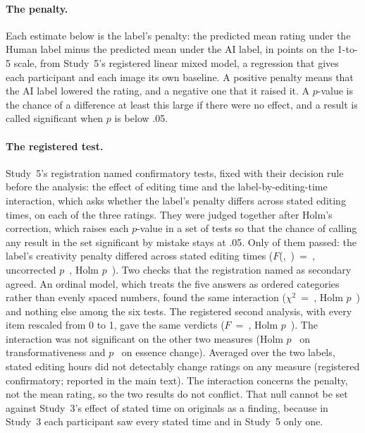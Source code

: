 \paragraph*{The penalty.}
Each estimate below is the label's penalty: the predicted mean rating under the Human label minus the predicted mean under the AI label, in points on the 1-to-5 scale, from Study~5's registered linear mixed model, a regression that gives each participant and each image its own baseline. A positive penalty means that the AI label lowered the rating, and a negative one that it raised it. A $p$-value is the chance of a difference at least this large if there were no effect, and a result is called significant when $p$ is below .05.

\paragraph*{The registered test.}
Study~5's registration named \SFiveNConfirmatory{} confirmatory tests, fixed with their decision rule before the analysis: the effect of editing time and the label-by-editing-time interaction, which asks whether the label's penalty differs across stated editing times, on each of the three ratings. They were judged together after Holm's correction, which raises each $p$-value in a set of tests so that the chance of calling any result in the set significant by mistake stays at .05. Only \SFiveNConfirmatoryHolmSignificant{} of them passed: the label's creativity penalty differed across stated editing times ($F$(\SFiveCreatSourceByEditTimeDfNum,~\SFiveCreatSourceByEditTimeDfDen)~=~\SFiveCreatSourceByEditTimeF, uncorrected $p$~\SFiveCreatSourceByEditTimeP, Holm $p$~\SFiveCreatSourceByEditTimePHolm). Two checks that the registration named as secondary agreed. An ordinal model, which treats the five answers as ordered categories rather than evenly spaced numbers, found the same interaction ($\chi^2$~=~\SFiveCreatSourceByEditTimeOrdChisq, Holm $p$~\SFiveCreatSourceByEditTimeOrdPHolm) and nothing else among the six tests. The registered second analysis, with every item rescaled from 0 to 1, gave the same verdicts ($F$~=~\SFiveCreatSourceByEditTimeRescaledF, Holm $p$~\SFiveCreatSourceByEditTimeRescaledPHolm). The interaction was not significant on the other two measures (Holm $p$~\SFiveTransSourceByEditTimePHolm{} on transformativeness and $p$~\SFiveEssSourceByEditTimePHolm{} on essence change). Averaged over the two labels, stated editing hours did not detectably change ratings on any measure (registered confirmatory; reported in the main text). The interaction concerns the penalty, not the mean rating, so the two results do not conflict. That null cannot be set against Study~3's effect of stated time on originals as a finding, because in Study~3 each participant saw every stated time and in Study~5 only one.

